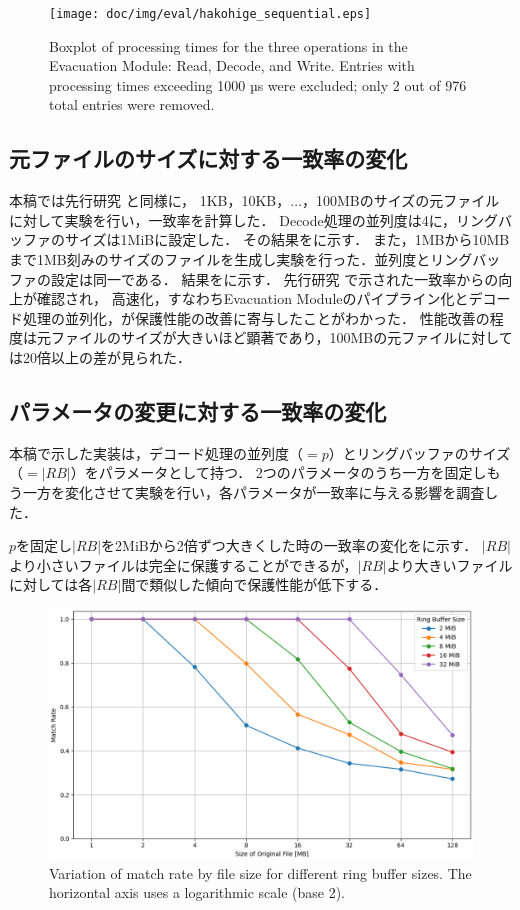 \begin{figure}[t]
  \begin{center}
    \texttt{[image: doc/img/eval/hakohige\_sequential.eps]}
  \end{center}
  \caption{Boxplot of processing times for the three operations in the Evacuation Module: Read, Decode, and Write.
    Entries with processing times exceeding 1000 µs were excluded; only 2 out of 976 total entries were removed.}
  \label{fig:elapsed-time}
\end{figure}

\subsection{元ファイルのサイズに対する一致率の変化}
本稿では先行研究 \cite{css2024} と同様に，
1KB，10KB，$\ldots$，100MBのサイズの元ファイルに対して実験を行い，一致率を計算した．
Decode処理の並列度は4に，リングバッファのサイズは1MiBに設定した．
その結果をに示す．
また，1MBから10MBまで1MB刻みのサイズのファイルを生成し実験を行った．並列度とリングバッファの設定は同一である．
結果をに示す．
先行研究 \cite{css2024} で示された一致率からの向上が確認され，
高速化，すなわちEvacuation Moduleのパイプライン化とデコード処理の並列化，が保護性能の改善に寄与したことがわかった．
性能改善の程度は元ファイルのサイズが大きいほど顕著であり，100MBの元ファイルに対しては20倍以上の差が見られた．

\subsection{パラメータの変更に対する一致率の変化}
本稿で示した実装は，デコード処理の並列度（$=p$）とリングバッファのサイズ（$=|RB|$）をパラメータとして持つ．
2つのパラメータのうち一方を固定しもう一方を変化させて実験を行い，各パラメータが一致率に与える影響を調査した．

$p$を固定し$|RB|$を2MiBから2倍ずつ大きくした時の一致率の変化をに示す．
$|RB|$より小さいファイルは完全に保護することができるが，$|RB|$より大きいファイルに対しては各$|RB|$間で類似した傾向で保護性能が低下する．
\begin{figure}[tb]
  \centering
  \includegraphics[width=0.9\columnwidth]{doc/img/eval/buf_capability_seek.eps}
  \caption{Variation of match rate by file size for different ring buffer sizes. The horizontal axis uses a logarithmic scale (base 2).}
  \label{fig:buf-capability}
\end{figure}

